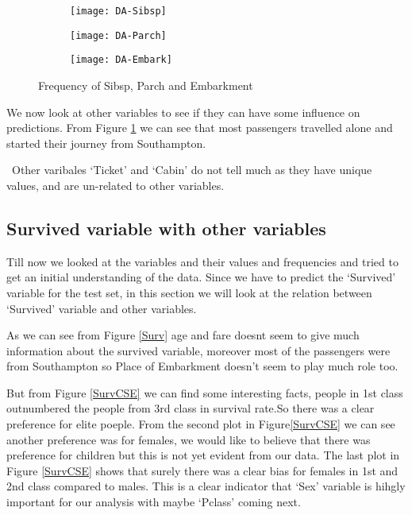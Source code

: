 \documentclass[a4paper,10pt]{report}\usepackage[]{graphicx}\usepackage[]{color}
\begin{document}
\begin{figure}[h]
\centering
  \begin{subfigure}[b]{0.3\textwidth}
    \texttt{[image: DA-Sibsp]}
    \end{subfigure}
  \begin{subfigure}[b]{0.3\textwidth}
    \texttt{[image: DA-Parch]}
    \end{subfigure}
  \begin{subfigure}[b]{0.3\textwidth}
    \texttt{[image: DA-Embark]}
  \end{subfigure}
  \caption{Frequency of Sibsp, Parch and Embarkment}\label{Var}
\end{figure}
We now look at other variables to see if they can have some influence on predictions. From Figure \ref{Var} we can see that  most passengers travelled alone and started their journey from Southampton.

\ Other varibales `Ticket' and `Cabin' do not tell much as they have unique values, and are un-related to other variables.
\subsection{Survived variable with other variables}
Till now we looked at the variables and their values and frequencies and tried to get an initial understanding of the data.
Since we have to predict the `Survived' variable for the test set, in this section we will look at the relation between `Survived' variable and other variables.

As we can see from Figure \ref{Surv} age and fare doesnt seem to give much information about the survived variable, moreover most of the passengers were from Southampton so Place of Embarkment doesn't seem to play much role too.

But from Figure \ref{SurvCSE} we can find some interesting facts, people in 1st class outnumbered the people from 3rd class in survival rate.So there was a clear preference for elite poeple. From the second plot in Figure\ref{SurvCSE} we can see another preference was for females, we would like to believe that there was preference for children but this is not yet evident from our data. The last plot in Figure \ref{SurvCSE} shows that surely there was a clear bias for females in 1st and 2nd class compared to males. This is a clear indicator that `Sex' variable is hihgly important for our analysis with maybe `Pclass' coming next.
\end{document}
